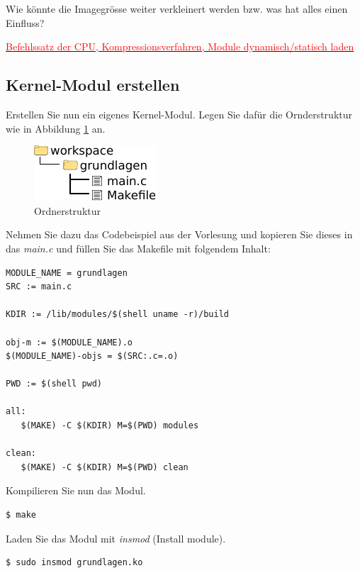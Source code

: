 Wie könnte die Imagegrösse weiter verkleinert werden bzw. was hat alles einen Einfluss?

\underline{\textcolor{red}{Befehlssatz der CPU, Kompressionsverfahren, Module dynamisch/statisch laden}\hspace{0.1\textwidth}}


\subsection{Kernel-Modul erstellen}

Erstellen Sie nun ein eigenes Kernel-Modul. Legen Sie dafür die Ornderstruktur
wie in Abbildung \ref{fig:basic_dirs2} an.
\clearpage

\begin{figure}[h!]
   \begin{center}
      \includegraphics{images/basic_dirs}
   \end{center}
   \caption{Ordnerstruktur}
   \label{fig:basic_dirs2}
\end{figure}

Nehmen Sie dazu das Codebeispiel aus der Vorlesung und kopieren Sie
dieses in das \emph{main.c} und füllen Sie das Makefile mit folgendem Inhalt:

\begin{lstlisting}[caption=Makefile]
MODULE_NAME = grundlagen
SRC := main.c

KDIR := /lib/modules/$(shell uname -r)/build

obj-m := $(MODULE_NAME).o
$(MODULE_NAME)-objs = $(SRC:.c=.o)

PWD := $(shell pwd)

all:
   $(MAKE) -C $(KDIR) M=$(PWD) modules

clean:
   $(MAKE) -C $(KDIR) M=$(PWD) clean

\end{lstlisting}

Kompilieren Sie nun das Modul.
\begin{lstlisting}
$ make
\end{lstlisting}

Laden Sie das Modul mit \emph{insmod} (Install module).
\begin{lstlisting}
$ sudo insmod grundlagen.ko
\end{lstlisting}

